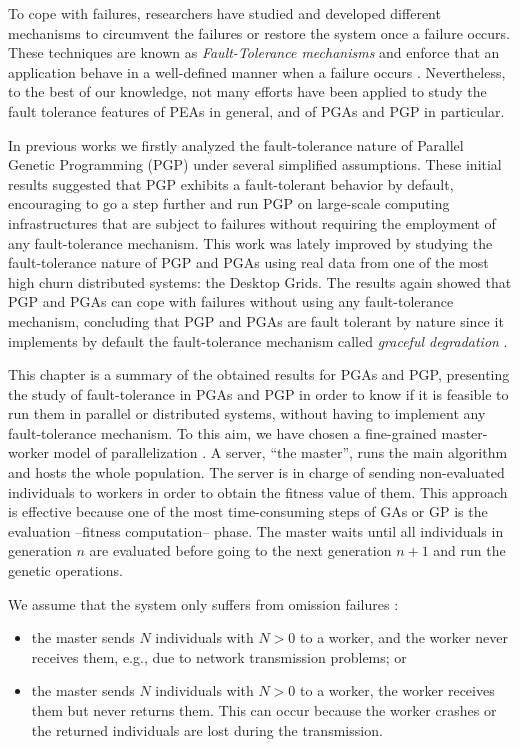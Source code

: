 \documentclass[graybox]{sty/svmult}
\begin{document}
To cope with failures, researchers have studied and developed different mechanisms to circumvent the failures or restore the
system once a failure occurs. These techniques are known as \emph{Fault-Tolerance mechanisms} and enforce that an
application behave in a well-defined manner when a failure occurs \cite{fault-tolerant-async}.
Nevertheless, to the best of our knowledge, not many efforts have been applied to study the fault
tolerance features of PEAs in general, and of PGAs and PGP in particular. 

In previous works \cite{cec-2007,gecco-2007-island-model} we firstly analyzed the fault-tolerance nature of Parallel Genetic
Programming (PGP) under several simplified assumptions. These initial results suggested that PGP exhibits a fault-tolerant behavior by
default, encouraging to go a step further and run PGP on large-scale computing infrastructures that are subject to failures
without requiring the employment of any fault-tolerance mechanism. This work was lately improved \cite{bads-2009, jfgcs-2010,
evocop-2010} by studying the fault-tolerance
nature of PGP and PGAs using real data from one of the most high churn
distributed systems: the Desktop Grids. The results again showed that PGP and PGAs can cope
with failures without using any fault-tolerance mechanism, concluding
that PGP and PGAs are fault tolerant by nature since it implements by default
the fault-tolerance mechanism called \emph{graceful degradation}
\cite{distributed-systems}. 

This chapter is a summary of the obtained results for PGAs and PGP, presenting the study of fault-tolerance in PGAs and PGP
in order to know if it is feasible to run them in parallel or distributed systems, without having to implement any fault-tolerance mechanism. 
To this aim, we have chosen a fine-grained master-worker model of parallelization \cite{spatially-structured-EAs}. A server, ``the master'', runs the
main algorithm and hosts the whole population. The server is in charge of sending non-evaluated individuals to workers in
order to obtain the fitness value of them. This approach is effective because one of the most time-consuming steps of GAs or
GP is the evaluation --fitness computation-- phase. The master waits until all individuals in generation $n$ are evaluated before
going to the next generation $n+1$ and run the genetic operations. 

We assume that the system only suffers from omission failures \cite{distributed-systems}: 
\begin{itemize}
    \item the master sends $N$ individuals with $N>0$ to a worker, and the worker never receives them,
e.g., due to network transmission problems; or
    \item the master sends $N$ individuals with $N>0$ to a worker, the worker receives them but never
returns them. This can occur because the worker crashes or the returned individuals are lost during the transmission.
\end{itemize}   
\end{document}
